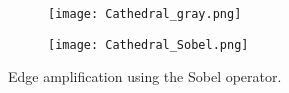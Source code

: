 \begin{figure}
\centering
\begin{subfigure}{.5\textwidth}
  \centering
  \texttt{[image: Cathedral\_gray.png]}
\end{subfigure}%
\begin{subfigure}{.5\textwidth}
  \centering
  \texttt{[image: Cathedral\_Sobel.png]}
\end{subfigure}
\caption{Edge amplification using the Sobel operator.}
\label{fig:Sobel}
\end{figure}


